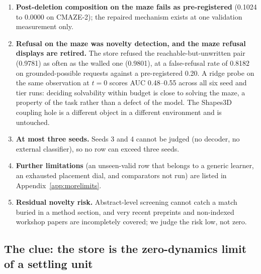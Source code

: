 \documentclass{article} %
\begin{document}
\begin{enumerate}[leftmargin=*,itemsep=1pt]
  of our landscape controls (Table~\ref{tab:lace-poe}); the study compares naive units only and has no
  working compositional-generation baseline.
\item \textbf{Post-deletion composition on the maze fails as pre-registered} (0.1024 to 0.0000
  on CMAZE-2); the repaired mechanism exists at one validation measurement only.
\item \textbf{Refusal on the maze was novelty detection, and the maze refusal displays are
  retired.} The store refused the reachable-but-unwritten pair (0.9781) as often as the walled
  one (0.9801), at a false-refusal rate of 0.8182 on grounded-possible requests against a
  pre-registered 0.20. %
  A ridge probe on the same observation at $t=0$ scores AUC 0.48--0.55 across all six seed and
  tier runs: deciding solvability within budget is close to solving the maze, a property of the
  task rather than a defect of the model. %
  The Shapes3D coupling hole is a different object in a different environment and is untouched.
\item \textbf{At most three seeds.} Seeds 3 and 4 cannot be judged (no decoder, no external
  classifier), so no row can exceed three seeds.
\item \textbf{Further limitations} (an unseen-valid row that belongs to a generic learner, an
  exhausted placement dial, and comparators not run) are listed in Appendix~\ref{app:morelimits}.
\item \textbf{Residual novelty risk.} Abstract-level screening cannot catch a match buried in a
  method section, and very recent preprints and non-indexed workshop papers are incompletely
  covered; we judge the risk low, not zero. %
\end{enumerate}

\subsection{The clue: the store is the zero-dynamics limit of a settling unit}
\label{sec:clue}
\end{document}
